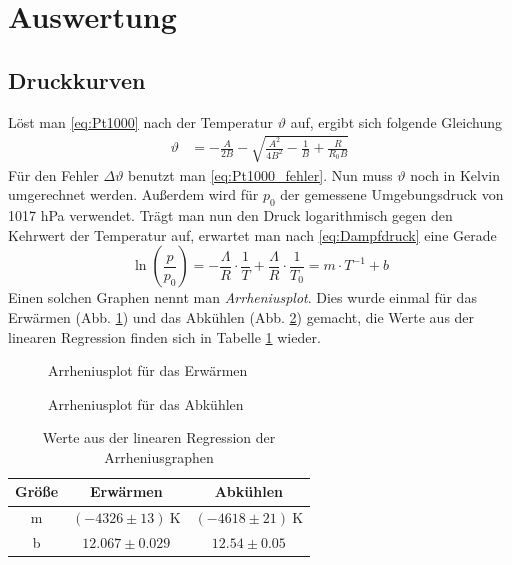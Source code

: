 \documentclass[12pt,a4paper,titlepage,headinclude,bibtotoc]{scrartcl}
\begin{document}
\section{Auswertung}
\label{sec:auswertung}
\subsection{Druckkurven}
Löst man \eqref{eq:Pt1000} nach der Temperatur $\vartheta$ auf, ergibt sich folgende Gleichung
\begin{align}
	\vartheta&=-\frac{A}{2B}-\sqrt{\frac{A^2}{4B^2}-\frac{1}{B}+\frac{R}{R_0 B}}
\end{align}
Für den Fehler $\Delta\vartheta$ benutzt man \eqref{eq:Pt1000_fehler}.
Nun muss $\vartheta$ noch in Kelvin umgerechnet werden.
Außerdem wird für $p_0$ der gemessene Umgebungsdruck von 1017 hPa verwendet.
Trägt man nun den Druck logarithmisch gegen den Kehrwert der Temperatur auf, erwartet man nach \eqref{eq:Dampfdruck} eine Gerade $$\ln\left(\frac{p}{p_0}\right) = -\frac{\Lambda}{R}\cdot\frac{1}{T}+\frac{\Lambda}{R}\cdot \frac{1}{T_0} = m \cdot T^{-1} + b$$
Einen solchen Graphen nennt man \textit{Arrheniusplot}.
Dies wurde einmal für das Erwärmen (Abb. \ref{fig:mess1}) und das Abkühlen (Abb. \ref{fig:mess2}) gemacht, die Werte aus der linearen Regression finden sich in Tabelle \ref{tab:regErg} wieder.

\begin{figure}[!htb]
	\centering
	
	\caption{Arrheniusplot für das Erwärmen}
	\label{fig:mess1}
\end{figure}

\begin{figure}[!htb]
	\centering
	
	\caption{Arrheniusplot für das Abkühlen}
	\label{fig:mess2}
\end{figure}

\begin{table}[!htb]
 \centering
 \begin{tabular}{|c|c|c|}
  \hline
  Größe&Erwärmen&Abkühlen\\
  \hline
  m & $(-4326 \pm 13)~\si{\kelvin}$ & $(-4618 \pm 21)~\si{\kelvin}$ \\
  b & $12.067  \pm 0.029$ & $12.54 \pm 0.05$ \\
  \hline
 \end{tabular}
 \caption{Werte aus der linearen Regression der Arrheniusgraphen} 
 \label{tab:regErg}
\end{table}
\end{document}
